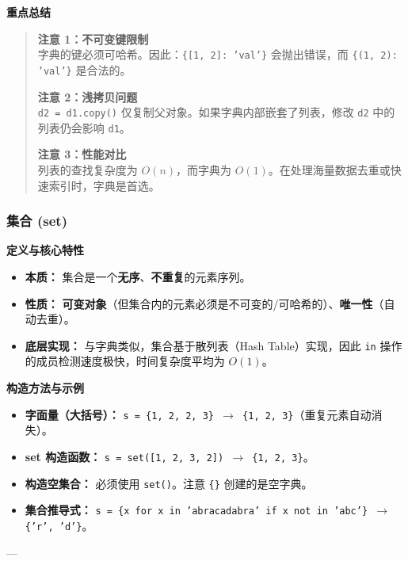 \documentclass{article}
\begin{document}
\textbf{重点总结}
\begin{quote}
\textbf{注意 1：不可变键限制} \\
字典的键必须可哈希。因此：\texttt{\{[1, 2]: 'val'\}} 会抛出错误，而 \texttt{\{(1, 2): 'val'\}} 是合法的。

\textbf{注意 2：浅拷贝问题} \\
\texttt{d2 = d1.copy()} 仅复制父对象。如果字典内部嵌套了列表，修改 \texttt{d2} 中的列表仍会影响 \texttt{d1}。

\textbf{注意 3：性能对比} \\
列表的查找复杂度为 $O(n)$，而字典为 $O(1)$。在处理海量数据去重或快速索引时，字典是首选。
\end{quote}

\subsubsection{集合 (set)}

\textbf{定义与核心特性}
\begin{itemize}
    \item \textbf{本质：} 集合是一个\textbf{无序}、\textbf{不重复}的元素序列。
    \item \textbf{性质：} \textbf{可变对象}（但集合内的元素必须是不可变的/可哈希的）、\textbf{唯一性}（自动去重）。
    \item \textbf{底层实现：} 与字典类似，集合基于散列表（Hash Table）实现，因此 \texttt{in} 操作的成员检测速度极快，时间复杂度平均为 $O(1)$。
\end{itemize}

\textbf{构造方法与示例}
\begin{itemize}
    \item \textbf{字面量（大括号）：} \texttt{s = \{1, 2, 2, 3\} $\rightarrow$ \{1, 2, 3\}}（重复元素自动消失）。
    \item \textbf{set 构造函数：} \texttt{s = set([1, 2, 3, 2]) $\rightarrow$ \{1, 2, 3\}}。
    \item \textbf{构造空集合：} 必须使用 \texttt{set()}。注意 \texttt{\{\}} 创建的是空字典。
    \item \textbf{集合推导式：} \texttt{s = \{x for x in 'abracadabra' if x not in 'abc'\} $\rightarrow$ \{'r', 'd'\}}。
\end{itemize}

---
\end{document}

